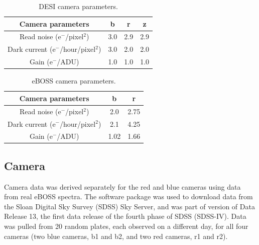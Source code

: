 
\begin{table}[h]
\caption{DESI camera parameters.}
\label{tab:desicam}
\centering
\begin{tabular}{|c|c|c|c|}
  \hline
  Camera parameters & b & r & z\\
  \hline \hline
  Read noise (e$^{-}$/pixel$^{2}$) & 3.0 & 2.9 & 2.9 \\
  \hline
  Dark current (e$^{-}$/hour/pixel$^{2}$) & 3.0 & 2.0 & 2.0 \\
  \hline
  Gain (e$^{-}$/ADU) & 1.0 & 1.0 & 1.0\\
  \hline
\end{tabular}
\end{table}

\begin{table}[h]
\caption{eBOSS camera parameters.}
\label{tab:ebosscam}
\centering
\begin{tabular}{|c|c|c|}
  \hline
  Camera parameters & b & r\\
  \hline \hline
  Read noise (e$^{-}$/pixel$^{2}$) & 2.0 & 2.75 \\
  \hline
  Dark current (e$^{-}$/hour/pixel$^{2}$) & 2.1 & 4.25 \\
  \hline
  Gain (e$^{-}$/ADU) & 1.02 & 1.66\\
  \hline
\end{tabular}
\end{table}

\subsection{Camera}

Camera data was derived separately for the red and blue cameras using data from real eBOSS spectra. The  software package \cite{bossdata} was used to download data from the Sloan Digital Sky Survey (SDSS) Sky Server, and was part of version  of Data Release 13, the first data release of the fourth phase of SDSS (SDSS-IV). Data was pulled from 20 random plates, each observed on a different day, for all four cameras (two blue cameras, b1 and b2, and two red cameras, r1 and r2). 

